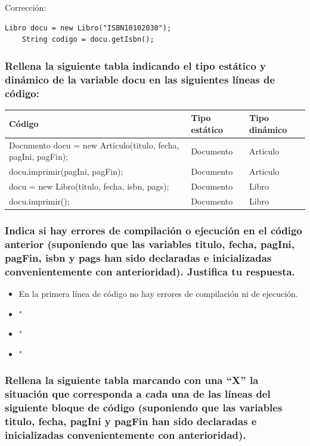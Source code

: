 \documentclass[a4paper,12pt]{article}
\begin{document}
Corrección:
\begin{lstlisting}[style=customjava, caption={Corrección del código}]
    Libro docu = new Libro("ISBN10102030");
    String codigo = docu.getIsbn();
\end{lstlisting}

\subsubsection*{Rellena la siguiente tabla indicando el tipo estático y dinámico de la variable docu en las siguientes líneas de código:
}    
    \begin{table}[H]
        \centering
        \begin{tabular}{|p{6cm}|l|l|}
            \hline
            \textbf{Código} & \textbf{Tipo estático} & \textbf{Tipo dinámico} \\ \hline
            Documento docu = new Articulo(titulo, fecha, pagIni, pagFin); & Documento & Articulo \\ \hline
            docu.imprimir(pagIni, pagFin); & Documento & Articulo \\ \hline
            docu = new Libro(titulo, fecha, isbn, pags); & Documento & Libro \\ \hline
            docu.imprimir(); & Documento & Libro \\ \hline
        \end{tabular}
    \end{table}


\subsubsection*{Indica si hay errores de compilación o ejecución en el código anterior (suponiendo que las variables titulo, fecha, pagIni, pagFin, isbn y pags han sido declaradas e inicializadas convenientemente con anterioridad). Justifica tu respuesta.}

\begin{itemize}
    \item En la primera línea de código no hay errores de compilación ni de ejecución.
    \item "
    \item "
    \item "
\end{itemize}

\subsubsection*{Rellena la siguiente tabla marcando con una “X” la situación que corresponda a cada una de las líneas del siguiente bloque de código (suponiendo que las variables titulo, fecha, pagIni y pagFin han sido declaradas e inicializadas convenientemente con anterioridad).}
\end{document}

